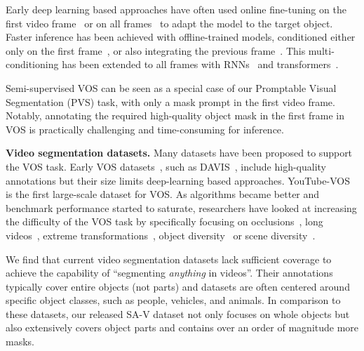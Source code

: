 \documentclass[]{fairmeta}
\renewcommand{\paragraph}[1]{\vspace{1.25mm}\noindent\textbf{#1}}
\renewcommand{\paragraph}[1]{\vspace{1.25mm}\noindent\textbf{#1}}
\begin{document}
Early deep learning based approaches have often used online fine-tuning on the first video frame~\citep{Caelles2016OneShotVO, Perazzi2016LearningVO, Yoon2017PixelLevelMF, Maninis2017VideoOS, Hu2018MaskRNNIL, Bhat2020LearningWT, Robinson2020LearningFA} or on all frames~\citep{Voigtlaender2017OnlineAO} to adapt the model to the target object.
Faster inference has been achieved with offline-trained models, conditioned either only on the first frame~\citep{Hu2018VideoMatchMB, Chen2018BlazinglyFV}, or also integrating the previous frame~\citep{Oh2018FastVO, Yang2018EfficientVO, Yang2020CollaborativeVO}. This multi-conditioning has been extended to all frames with RNNs~\citep{Xu2018YouTubeVOSSV} and transformers~\citep{Oh2019VideoOS, Cheng2021RethinkingSN, Li2022RecurrentDE, yang2021aot, yang2021aost, cheng2022xmem, yang2022deaot, Wang2022LookBY, cheng2023putting, Goyal2023TAMVTTM,Zhang2023JointMO, wu2023scalable}. %

Semi-supervised VOS can be seen as a special case of our Promptable Visual Segmentation (PVS) task, with only a mask prompt in the first video frame. Notably, annotating the required high-quality object mask in the first frame in VOS is practically challenging and time-consuming for inference.

\paragraph{Video segmentation datasets.} Many datasets have been proposed to support the VOS task. Early VOS datasets~\citep{Prest2012LearningOC, Li2013VideoSB, Ochs2014SegmentationOM, fan2015jumpcut}, such as DAVIS~\citep{Pont-Tuset_arXiv_2017, caelles20192019}, include high-quality annotations but their size limits deep-learning based approaches. YouTube-VOS~\citep{Xu2018YouTubeVOSAL} is the first large-scale dataset for VOS. As algorithms became better and benchmark performance started to saturate, researchers have looked at increasing the difficulty of the VOS task by specifically focusing on occlusions~\citep{qi2022occluded, Ding2023MOSEAN}, long videos~\citep{hong2023lvos, hong2024lvos}, extreme transformations~\citep{Tokmakov2022BreakingT}, object diversity~\citep{wang2021unidentified, wang2023towards} or scene diversity~\citep{Athar2022BURSTAB}. 

We find that current video segmentation datasets lack sufficient coverage to achieve the capability of ``segmenting \textit{anything} in videos''. Their annotations typically cover entire objects (not parts) and datasets are often centered around specific object classes, such as people, vehicles, and animals. In comparison to these datasets, our released SA-V dataset not only focuses on whole objects but also extensively covers object parts and contains over an order of magnitude more masks.
\end{document}
